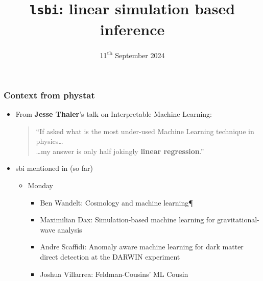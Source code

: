 \documentclass[aspectratio=169]{beamer}
\title{\texttt{lsbi}: linear simulation based inference }
\date{11\textsuperscript{th} September 2024}
\begin{document}
\begin{frame}
    \titlepage
\end{frame}

\begin{frame}
    \frametitle{Context from phystat}
    \begin{itemize}
        \item From \textbf{Jesse Thaler}'s talk on Interpretable Machine Learning:
            \begin{quote}
                ``If asked what is the most under-used Machine Learning technique in physics\ldots\\ \hfill\ldots my answer is only half jokingly \textbf{linear regression}.''
            \end{quote}
        \item sbi mentioned in (so far)
            \begin{itemize}
                \item Monday
                    \begin{itemize}
                        \item Ben Wandelt: Cosmology and machine learning¶
                        \item Maximilian Dax: Simulation-based machine learning for gravitational-wave analysis
                        \item Andre Scaffidi: Anomaly aware machine learning for dark matter direct detection at the DARWIN experiment
                        \item Joshua Villarrea: Feldman-Cousins’ ML Cousin
                    \end{itemize}
            \end{itemize}
    \end{itemize}
\end{frame}
\end{document}
